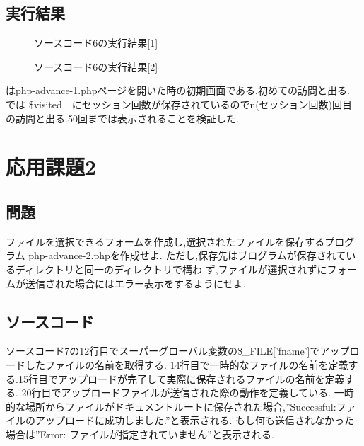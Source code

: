 \documentclass[a4j,10pt]{jsarticle}
\begin{document}


\subsection{実行結果}

\begin{figure}[H]
  \centering
  \caption{ソースコード6の実行結果[1]}
\label{fig:ad1}
\end{figure}

\begin{figure}[H]
  \centering
  \caption{ソースコード6の実行結果[2]}
\label{fig:ad2}
\end{figure}


はphp-advance-1.phpページを開いた時の初期画面である.初めての訪問と出る.
では \$visited　にセッション回数が保存されているのでn(セッション回数)回目の訪問と出る.50回までは表示されることを検証した.


\section{応用課題2}

\subsection{問題}


  ファイルを選択できるフォームを作成し,選択されたファイルを保存するプログラム
php-advance-2.phpを作成せよ.
ただし,保存先はプログラムが保存されているディレクトリと同一のディレクトリで構わ
ず,ファイルが選択されずにフォームが送信された場合にはエラー表示をするようにせよ.

\subsection{ソースコード}

  ソースコード7の12行目でスーパーグローバル変数の\$\_FILE['fname']でアップロードしたファイルの名前を取得する.
  14行目で一時的なファイルの名前を定義する.15行目でアップロードが完了して実際に保存されるファイルの名前を定義する.
  20行目でアップロードファイルが送信された際の動作を定義している.
  一時的な場所からファイルがドキュメントルートに保存された場合,”Successful:ファイルのアップロードに成功しました.”と表示される.
  もし何も送信されなかった場合は”Error: ファイルが指定されていません”と表示される.
\end{document}
